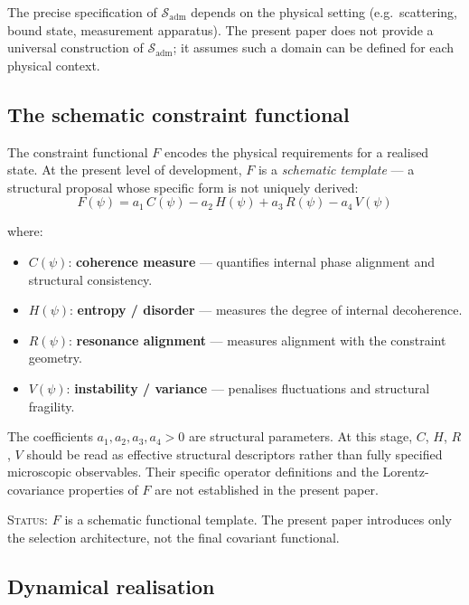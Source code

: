 \documentclass[12pt]{article}
\begin{document}
The precise specification of $\mathcal{S}_{\mathrm{adm}}$ depends on the physical setting (e.g.\ scattering, bound state, measurement apparatus). The present paper does not provide a universal construction of $\mathcal{S}_{\mathrm{adm}}$; it assumes such a domain can be defined for each physical context.

\subsection{The schematic constraint functional}

The constraint functional $F$ encodes the physical requirements for a realised state. At the present level of development, $F$ is a \textit{schematic template} --- a structural proposal whose specific form is not uniquely derived:
\begin{equation}\label{eq:functional}
    F(\psi) = a_1\, C(\psi) - a_2\, H(\psi) + a_3\, R(\psi) - a_4\, V(\psi)
\end{equation}

where:
\begin{itemize}
    \item $C(\psi)$: \textbf{coherence measure} --- quantifies internal phase alignment and structural consistency.
    \item $H(\psi)$: \textbf{entropy / disorder} --- measures the degree of internal decoherence.
    \item $R(\psi)$: \textbf{resonance alignment} --- measures alignment with the constraint geometry.
    \item $V(\psi)$: \textbf{instability / variance} --- penalises fluctuations and structural fragility.
\end{itemize}

The coefficients $a_1, a_2, a_3, a_4 > 0$ are structural parameters. At this stage, $C$, $H$, $R$, $V$ should be read as effective structural descriptors rather than fully specified microscopic observables. Their specific operator definitions and the Lorentz-covariance properties of $F$ are not established in the present paper.

\textsc{Status:} $F$ is a schematic functional template. The present paper introduces only the selection architecture, not the final covariant functional.

\subsection{Dynamical realisation}
\end{document}
